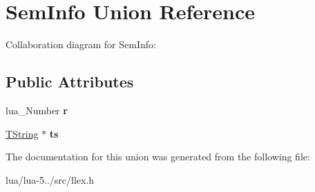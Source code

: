 \hypertarget{union_sem_info}{\section{Sem\+Info Union Reference}
\label{union_sem_info}
}


Collaboration diagram for Sem\+Info\+:
\subsection*{Public Attributes}
\begin{DoxyCompactItemize}
\item 
\hypertarget{union_sem_info_a43b00f784510a2d500550b81578177d8}{lua\+\_\+\+Number {\bfseries r}}\label{union_sem_info_a43b00f784510a2d500550b81578177d8}

\item 
\hypertarget{union_sem_info_a393ebb62432ff3e689283e54e113b33e}{\hyperlink{union_t_string}{T\+String} $\ast$ {\bfseries ts}}\label{union_sem_info_a393ebb62432ff3e689283e54e113b33e}

\end{DoxyCompactItemize}


The documentation for this union was generated from the following file\+:\begin{DoxyCompactItemize}
\item 
lua/lua-\/5../src/llex.\+h\end{DoxyCompactItemize}

